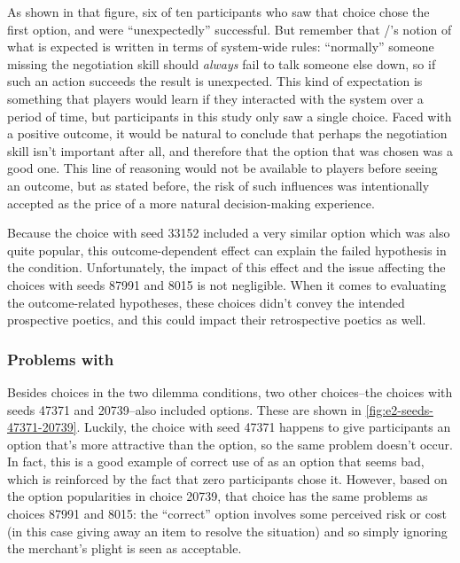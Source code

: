 As shown in that figure, six of ten participants who saw that choice chose the first option, and were ``unexpectedly'' successful.
%
But remember that \dunyazad/'s notion of what is expected is written in terms of system-wide rules: ``normally'' someone missing the negotiation skill should \emph{always} fail to talk someone else down, so if such an action succeeds the result is unexpected.
%
This kind of expectation is something that players would learn if they interacted with the system over a period of time, but participants in this study only saw a single choice.
%
Faced with a positive outcome, it would be natural to conclude that perhaps the negotiation skill isn't important after all, and therefore that the option that was chosen was a good one.
%
This line of reasoning would not be available to players before seeing an outcome, but as stated before, the risk of such influences was intentionally accepted as the price of a more natural decision-making experience.


Because the choice with seed 33152 included a very similar  option which was also quite popular, this outcome-dependent effect can explain the failed hypothesis in the \unxs{} condition.
%
Unfortunately, the impact of this effect and the  issue affecting the choices with seeds 87991 and 8015 is not negligible.
%
When it comes to evaluating the outcome-related hypotheses, these choices didn't convey the intended prospective poetics, and this could impact their retrospective poetics as well.


\subsubsection{Problems with }


Besides choices in the two dilemma conditions, two other choices--the \obvs{} choices with seeds 47371 and 20739--also included  options.
%
These are shown in \cref{fig:e2-seeds-47371-20739}.
%
Luckily, the choice with seed 47371 happens to give participants an option that's more attractive than the  option, so the same problem doesn't occur.
%
In fact, this is a good example of correct use of  as an option that seems bad, which is reinforced by the fact that zero participants chose it.
%
However, based on the option popularities in choice 20739, that choice has the same problems as choices 87991 and 8015: the ``correct'' option involves some perceived risk or cost (in this case giving away an item to resolve the situation) and so simply ignoring the merchant's plight is seen as acceptable.


